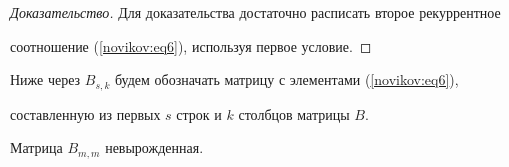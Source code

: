 \smallskip



\begin{proof}[Доказательство]

Для доказательства достаточно расписать второе рекуррентное

соотношение (\ref{novikov:eq6}), используя первое условие.

\end{proof}



\smallskip



Ниже через $B_{s,k}$ будем обозначать матрицу с элементами (\ref{novikov:eq6}),

составленную из первых $s$ строк и $k$ столбцов матрицы $B$.



\smallskip



\begin{lemma}[2] Матрица $B_{m,m}$ невырожденная$.$

\end{lemma}



\smallskip



